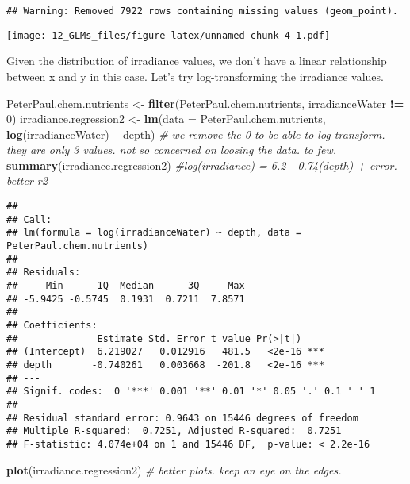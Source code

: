 \documentclass[]{article}
\newenvironment{Shaded}{\begin{snugshade}}{\end{snugshade}}
\newcommand{\KeywordTok}[1]{\textcolor[rgb]{0.13,0.29,0.53}{\textbf{#1}}}
\newcommand{\DataTypeTok}[1]{\textcolor[rgb]{0.13,0.29,0.53}{#1}}
\newcommand{\DecValTok}[1]{\textcolor[rgb]{0.00,0.00,0.81}{#1}}
\newcommand{\StringTok}[1]{\textcolor[rgb]{0.31,0.60,0.02}{#1}}
\newcommand{\CommentTok}[1]{\textcolor[rgb]{0.56,0.35,0.01}{\textit{#1}}}
\newcommand{\OperatorTok}[1]{\textcolor[rgb]{0.81,0.36,0.00}{\textbf{#1}}}
\newcommand{\NormalTok}[1]{#1}
\begin{document}
\begin{verbatim}
## Warning: Removed 7922 rows containing missing values (geom_point).
\end{verbatim}

\texttt{[image: 12\_GLMs\_files/figure-latex/unnamed-chunk-4-1.pdf]}

Given the distribution of irradiance values, we don't have a linear
relationship between x and y in this case. Let's try log-transforming
the irradiance values.

\begin{Shaded}
\begin{Highlighting}[]
\NormalTok{PeterPaul.chem.nutrients <-}\StringTok{ }\KeywordTok{filter}\NormalTok{(PeterPaul.chem.nutrients, irradianceWater }\OperatorTok{!=}\StringTok{ }\DecValTok{0}\NormalTok{)}
\NormalTok{irradiance.regression2 <-}\StringTok{ }\KeywordTok{lm}\NormalTok{(}\DataTypeTok{data =}\NormalTok{ PeterPaul.chem.nutrients, }\KeywordTok{log}\NormalTok{(irradianceWater) }\OperatorTok{~}\StringTok{ }\NormalTok{depth) }\CommentTok{# we remove the 0 to be able to log  transform. they are only 3 values. not so concerned on loosing the data. to few.}
\KeywordTok{summary}\NormalTok{(irradiance.regression2) }\CommentTok{#log(irradiance) = 6.2 - 0.74(depth) + error. better r2}
\end{Highlighting}
\end{Shaded}

\begin{verbatim}
## 
## Call:
## lm(formula = log(irradianceWater) ~ depth, data = PeterPaul.chem.nutrients)
## 
## Residuals:
##     Min      1Q  Median      3Q     Max 
## -5.9425 -0.5745  0.1931  0.7211  7.8571 
## 
## Coefficients:
##              Estimate Std. Error t value Pr(>|t|)    
## (Intercept)  6.219027   0.012916   481.5   <2e-16 ***
## depth       -0.740261   0.003668  -201.8   <2e-16 ***
## ---
## Signif. codes:  0 '***' 0.001 '**' 0.01 '*' 0.05 '.' 0.1 ' ' 1
## 
## Residual standard error: 0.9643 on 15446 degrees of freedom
## Multiple R-squared:  0.7251, Adjusted R-squared:  0.7251 
## F-statistic: 4.074e+04 on 1 and 15446 DF,  p-value: < 2.2e-16
\end{verbatim}

\begin{Shaded}
\begin{Highlighting}[]
\KeywordTok{plot}\NormalTok{(irradiance.regression2) }\CommentTok{# better plots. keep an eye on the edges.}
\end{Highlighting}
\end{Shaded}
\end{document}
